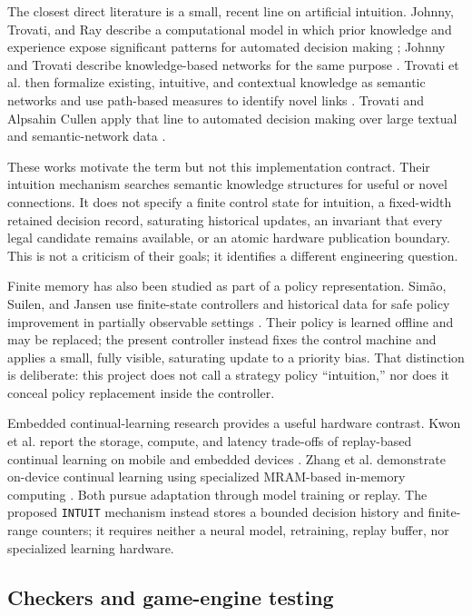 \documentclass[11pt]{article}
\begin{document}
The closest direct literature is a small, recent line on artificial intuition.
Johnny, Trovati, and Ray describe a computational model in which prior
knowledge and experience expose significant patterns for automated decision
making \cite{johnny2020computationalintuition}; Johnny and Trovati describe
knowledge-based networks for the same purpose \cite{johnnyTrovati2020knowledge}.
Trovati et al. then formalize existing, intuitive, and contextual knowledge as
semantic networks and use path-based measures to identify novel links
\cite{trovati2022newintuition}. Trovati and Alpsahin Cullen apply that line to
automated decision making over large textual and semantic-network data
\cite{trovatiCullen2023automatedintuition}.

These works motivate the term but not this implementation contract. Their
intuition mechanism searches semantic knowledge structures for useful or novel
connections. It does not specify a finite control state for intuition, a
fixed-width retained decision record, saturating historical updates, an
invariant that every legal candidate remains available, or an atomic hardware
publication boundary. This is not a criticism of their goals; it identifies a
different engineering question.

Finite memory has also been studied as part of a policy representation.
Sim\~ao, Suilen, and Jansen use finite-state controllers and historical data
for safe policy improvement in partially observable settings
\cite{simao2023safeFSC}. Their policy is learned offline and may be replaced;
the present controller instead fixes the control machine and applies a small,
fully visible, saturating update to a priority bias. That distinction is
deliberate: this project does not call a strategy policy ``intuition,'' nor
does it conceal policy replacement inside the controller.

Embedded continual-learning research provides a useful hardware contrast.
Kwon et al. report the storage, compute, and latency trade-offs of replay-based
continual learning on mobile and embedded devices \cite{kwon2021embeddedcontinual}.
Zhang et al. demonstrate on-device continual learning using specialized
MRAM-based in-memory computing \cite{zhang2024mramcontinual}. Both pursue
adaptation through model training or replay. The proposed \texttt{INTUIT}
mechanism instead stores a bounded decision history and finite-range counters;
it requires neither a neural model, retraining, replay buffer, nor specialized
learning hardware.

\subsection{Checkers and game-engine testing}
\end{document}

